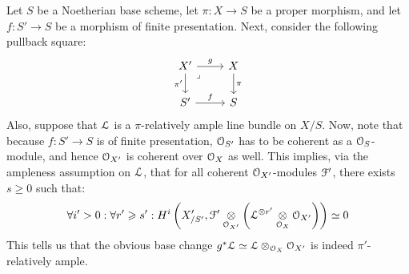                     \begin{remark} \label{remark: base_changing_ample_line_bundles}
                        Let $S$ be a Noetherian base scheme, let $\pi: X \to S$ be a proper morphism, and let $f: S' \to S$ be a morphism of finite presentation. Next, consider the following pullback square:
                            $$
                                \begin{tikzcd}
                                	{X'} & X \\
                                	{S'} & S
                                	\arrow["g", from=1-1, to=1-2]
                                	\arrow["{\pi'}"', from=1-1, to=2-1]
                                	\arrow["\pi", from=1-2, to=2-2]
                                	\arrow["f", from=2-1, to=2-2]
                                	\arrow["\lrcorner"{anchor=center, pos=0.125}, draw=none, from=1-1, to=2-2]
                                \end{tikzcd}
                            $$
                        Also, suppose that $\mathcal{L}$ is a $\pi$-relatively ample line bundle on $X/S$. Now, note that because $f: S' \to S$ is of finite presentation, $\mathcal{O}_{S'}$ has to be coherent as a $\mathcal{O}_S$-module, and hence $\mathcal{O}_{X'}$ is coherent over $\mathcal{O}_X$ as well. This implies, via the ampleness assumption on $\mathcal{L}$, that for all coherent $\mathcal{O}_{X'}$-modules $\mathcal{F}'$, there exists $s \geq 0$ such that:
                            $$\forall i' > 0: \forall r' \geq s': H^i\left(X'_{/S'}, \calF' \tensor_{\calO_{X'}} \left(\calL^{\tensor r'} \tensor_{\calO_X} \calO_{X'}\right)\right) \cong 0$$
                        This tells us that the obvious base change $g^*\calL \cong \calL \tensor_{\calO_X} \calO_{X'}$ is indeed $\pi'$-relatively ample.
                    \end{remark}
                    
